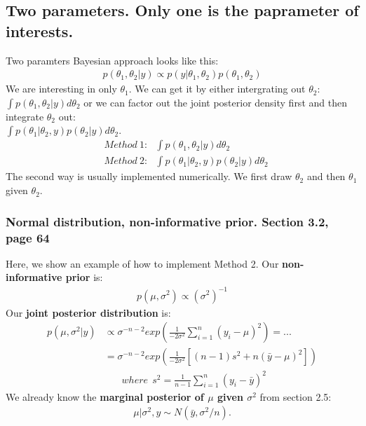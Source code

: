 \documentclass[]{article}
\begin{document}
\subsection{Two parameters. Only one is the paprameter of interests.}
Two paramters Bayesian approach looks like this:
$$
\begin{aligned}
	p(\theta_1, \theta_2|y) \propto p(y|\theta_1, \theta_2)p(\theta_1, \theta_2)
\end{aligned}
$$
We are interesting in only $\theta_1$. We can get it by either intergrating out $\theta_2$: $\int p(\theta_1, \theta_2|y) d\theta_2$ or we can factor out the joint posterior density first and then integrate $\theta_2$ out:\\
$\int p(\theta_1|\theta_2,y)p(\theta_2|y) d\theta_2$.
$$
\begin{aligned}
	&Method~1:~~~\int p(\theta_1, \theta_2|y) d\theta_2\\
	&Method~2:~~~\int p(\theta_1|\theta_2,y)p(\theta_2|y) d\theta_2
\end{aligned}
$$
The second way is usually implemented numerically. We first draw $\theta_2$ and then $\theta_1$ given $\theta_2$.

\subsubsection{Normal distribution, non-informative prior. Section 3.2, page 64}
Here, we show an example of how to implement Method 2.
Our \textbf{non-informative prior} is:
$$
\begin{aligned}
	p(\mu, \sigma^2) \propto \left( \sigma^2 \right)^{-1}
\end{aligned}
$$
Our \textbf{joint posterior distribution} is:
$$
\begin{aligned}
	p(\mu, \sigma^2|y) &\propto  \sigma^{-n-2} exp\left(\frac{1}{  -2\sigma^2 }   \sum_{i=1}^n(y_i - \mu)^2 \right) =...\\
	                 & =  \sigma^{-n-2} exp\left(\frac{1}{  -2\sigma^2 }   \left[  (n-1)s^2 + n(\bar{y} - \mu)^2 \right] \right)\\
									 &~~~~~~~~where~~s^2 = \frac{1}{n-1}\sum_{i=1}^n(y_i - \bar{y})^2
\end{aligned}
$$
We already know the \textbf{marginal posterior of $\mu$ given $\sigma^2$} from section 2.5:
$$
\begin{aligned}
	\mu| \sigma^2,y \sim N\left(\bar{y}, \sigma^2/n \right).
\end{aligned}
$$
\end{document}
